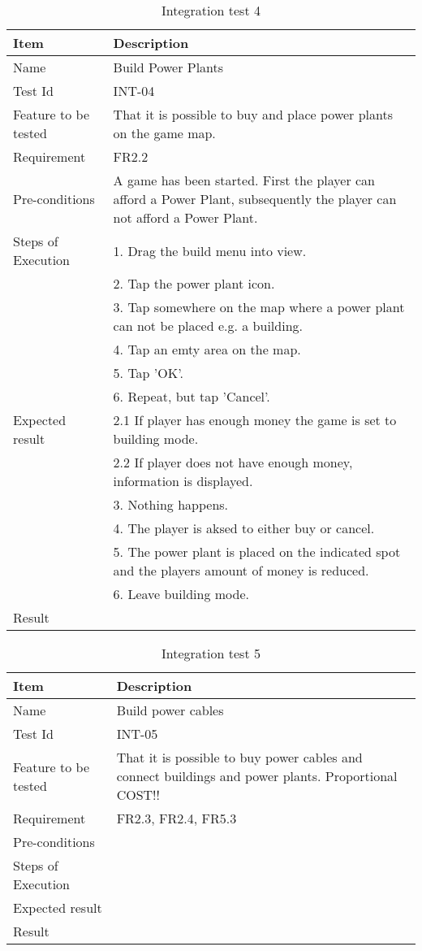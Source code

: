 \begin{table}[H]
\centering
	\begin{tabular}{ l | p{8cm} }
		\hline
		{\bf Item} & {\bf Description} \\ \hline
		Name & Build Power Plants \\ 
		Test Id & INT-04 \\ 
		Feature to be tested & That it is possible to buy and place power plants on the game map. \\ 
		Requirement & FR2.2 \\ 
		Pre-conditions & A game has been started. First the player can afford a Power Plant, subsequently the player can not afford a Power Plant. \\
		Steps of Execution & 1. Drag the build menu into view. \\ 
		& 2. Tap the power plant icon. \\
		& 3. Tap somewhere on the map where a power plant can not be placed e.g. a building. \\
		& 4. Tap an emty area on the map. \\
		& 5. Tap 'OK'. \\
		& 6. Repeat, but tap 'Cancel'. \\
		Expected result & 2.1 If player has enough money the game is set to building mode. \\
		& 2.2 If player does not have enough money, information is displayed. \\
		& 3. Nothing happens. \\ 
		& 4. The player is aksed to either buy or cancel. \\
		& 5. The power plant is placed on the indicated spot and the players amount of money is reduced. \\
		& 6. Leave building mode. \\
		Result & \\ 
	\end{tabular}
	\caption{Integration test 4}
\end{table}

\begin{table}[H]
\centering
	\begin{tabular}{ l | p{8cm} }
		\hline
		{\bf Item} & {\bf Description} \\ \hline
		Name & Build power cables \\ 
		Test Id & INT-05\\ 
		Feature to be tested &  That it is possible to buy power cables and connect buildings and power plants. Proportional COST!! \\ 
		Requirement & FR2.3, FR2.4, FR5.3 \\ 
		Pre-conditions & \\ 
		Steps of Execution & \\ 
		Expected result & \\ 
		Result & \\ 
	\end{tabular}
	\caption{Integration test 5}
\end{table}

